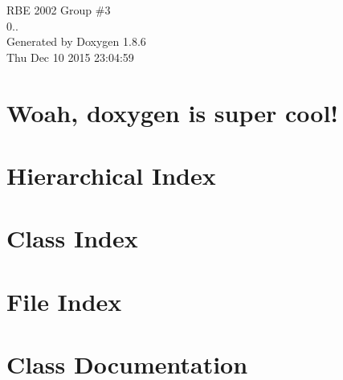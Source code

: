 \documentclass[twoside]{book}
\newcommand{\clearemptydoublepage}{%
  \newpage{\pagestyle{empty}\cleardoublepage}%
}
\begin{document}
\hypersetup{pageanchor=false}
\begin{titlepage}
\vspace*{7cm}
\begin{center}%
{\Large R\-B\-E 2002 Group \#3 \\[1ex]\large 0.. }\\
\vspace*{1cm}
{\large Generated by Doxygen 1.8.6}\\
\vspace*{0.5cm}
{\small Thu Dec 10 2015 23:04:59}\\
\end{center}
\end{titlepage}
\clearemptydoublepage
\tableofcontents
\clearemptydoublepage
{}
\hypersetup{pageanchor=true}

\chapter{Woah, doxygen is super cool!}
\label{index}\hypertarget{index}{}
\chapter{Hierarchical Index}

\chapter{Class Index}

\chapter{File Index}

\chapter{Class Documentation}




















\end{document}
